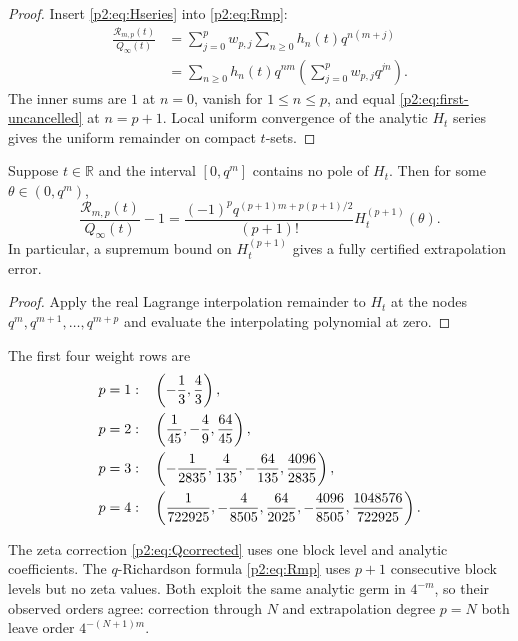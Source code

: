 \documentclass[11pt,oneside]{article}
\numberwithin{equation}{section}
\theoremstyle{definition}
\theoremstyle{remark}
\newcommand{\R}{\mathbb R}
\begin{document}
\begin{proof}
Insert \eqref{p2:eq:Hseries} into \eqref{p2:eq:Rmp}:
\begin{align*}
 \frac{\mathcal R_{m,p}(t)}{Q_\infty(t)}
 &=\sum_{j=0}^{p}w_{p,j}\sum_{n\ge0}h_n(t)q^{n(m+j)}\\
 &=\sum_{n\ge0}h_n(t)q^{nm}
   \left(\sum_{j=0}^{p}w_{p,j}q^{jn}\right).
\end{align*}
The inner sums are $1$ at $n=0$, vanish for $1\le n\le p$, and equal
\eqref{p2:eq:first-uncancelled} at $n=p+1$.  Local uniform convergence of the analytic $H_t$
series gives the uniform remainder on compact $t$-sets.
\end{proof}

\begin{corollary}
\label{p2:cor:Richardson-bound}
Suppose $t\in\R$ and the interval $[0,q^m]$ contains no pole of $H_t$.  Then for some
$\theta\in(0,q^m)$,
\begin{equation}
 \frac{\mathcal R_{m,p}(t)}{Q_\infty(t)}-1
 =\frac{(-1)^pq^{(p+1)m+p(p+1)/2}}{(p+1)!}
 H_t^{(p+1)}(\theta).
 \label{p2:eq:Richardson-remainder}
\end{equation}
In particular, a supremum bound on $H_t^{(p+1)}$ gives a fully certified extrapolation error.
\end{corollary}

\begin{proof}
Apply the real Lagrange interpolation remainder to $H_t$ at the nodes
$q^m,q^{m+1},\ldots,q^{m+p}$ and evaluate the interpolating polynomial at zero.
\end{proof}

The first four weight rows are
\begin{align}
 p=1:&\quad \left(-\frac13,\frac43\right),\notag\\
 p=2:&\quad \left(\frac1{45},-\frac49,\frac{64}{45}\right),\notag\\
 p=3:&\quad \left(-\frac1{2835},\frac4{135},-\frac{64}{135},\frac{4096}{2835}\right),
 \label{p2:eq:weights-first}\\
 p=4:&\quad \left(\frac1{722925},-\frac4{8505},\frac{64}{2025},
 -\frac{4096}{8505},\frac{1048576}{722925}\right).\notag
\end{align}

\begin{remark}
The zeta correction \eqref{p2:eq:Qcorrected} uses one block level and analytic coefficients.
The $q$-Richardson formula \eqref{p2:eq:Rmp} uses $p+1$ consecutive block levels but no zeta
values.  Both exploit the same analytic germ in $4^{-m}$, so their observed orders agree:
correction through $N$ and extrapolation degree $p=N$ both leave order $4^{-(N+1)m}$.
\end{remark}
\end{document}
